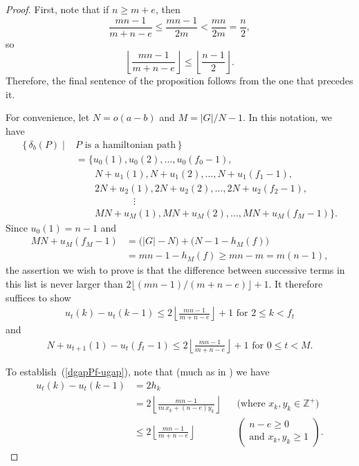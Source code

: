 \documentclass[11pt]{amsart}
\theoremstyle{definition}
\numberwithin{case}{startcases}
\numberwithin{equation}{section}
\newcommand{\Z}{\mathbb{Z}}  %
\begin{document}
	\begin{proof}
		First, note that if $n \ge m + e$, then 
		\[ \frac{mn - 1}{m + n - e}
		\le \frac{mn - 1}{2m} 
		< \frac{mn}{2m} 
		= \frac{n}{2} , \]
		so
		\[ \left\lfloor \frac{mn - 1}{m + n - e} \right\rfloor
		\le \left\lfloor \frac{n - 1}{2} \right\rfloor
		. \]
		Therefore, the final sentence of the proposition follows from the one that precedes it.
		
		For convenience, let $N = o(a - b)$ and $M = |G|/N - 1$. In this notation, we have
		\begin{align*}
			\{\, \delta_{b}(P) \mid & \text{$P$ is a hamiltonian path} \,\}
			\\&= \{ u_0(1), u_0(2), \ldots, u_0(f_0-1),
			\\& \qquad N + u_1(1), N + u_1(2), \ldots, N + u_1(f_1-1),
			\\& \qquad 2N + u_2(1), 2N + u_2(2), \ldots, 2N + u_2(f_2-1),
			\\& \qquad \qquad \qquad  \vdots %
			\\& \qquad MN + u_M(1), MN + u_M(2), \ldots, MN + u_M(f_M-1) \}
			. \end{align*}
		Since $u_0(1) = n - 1$ and
		\begin{align*}
			MN + u_M(f_M - 1) 
			&= \bigl(|G| - N \bigr) + \bigl( N - 1 - h_M(f) \bigr)
			\\&= mn - 1 - h_M(f)
			\ge mn - m
			= m(n-1)
			, \end{align*}
		the assertion we wish to prove is that the difference between successive terms in this list is never larger than $2 \lfloor (mn - 1)/(m + n - e) \rfloor + 1$. It therefore suffices to show 
		\begin{align} \label{dgapPf-ugap}
			\text{$u_t(k) - u_t(k-1) \le 2 \left\lfloor \frac{mn - 1}{m + n - e} \right\rfloor + 1$ for $2 \le k < f_t$}
		\end{align}
		and 
		\begin{align} \label{dgapPf-intergap}
			\text{$N + u_{t+1}(1) - u_t(f_t - 1) \le 2 \left\lfloor \frac{mn - 1}{m + n - e} \right\rfloor + 1$ for $0 \le t < M$}
			. \end{align}
		
		To establish~(\ref{dgapPf-ugap}), note that (much as in \cite[Case~1 on p.~67]{Curran}) we have
		\begin{align*}
			u_t(k) - u_t(k-1) 
			&= 2 h_k 
			\\&= 2 \left\lfloor \frac{mn - 1}{m \, x_k + (n - e) y_k} \right\rfloor 
			&& \text{(where $x_k, y_k \in \Z^+$)}
			\\&\le 2 \left\lfloor \frac{mn - 1}{m + n - e} \right\rfloor
			&& \begin{pmatrix} n - e \ge 0 \\ \text{and $x_k, y_k \ge 1$} \end{pmatrix}
			. \end{align*}
		

\end{proof}
\end{document}
